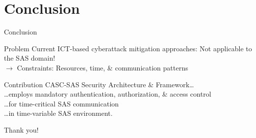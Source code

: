 \documentclass[en]{sdqbeamer}
\begin{document}
\section{Conclusion}
\begin{frame}{Conclusion}
    \begin{redblock}{Problem}
        Current ICT-based cyberattack mitigation approaches: Not applicable to the SAS domain!
        \\$\rightarrow$ Constraints: Resources, time, \& communication patterns
    \end{redblock}
    \begin{blueblock}{Contribution}
        CASC-SAS Security Architecture \& Framework\dots
        \\\dots employs mandatory authentication, authorization, \& access control
        \\\dots for time-critical SAS communication
        \\\dots in time-variable SAS environment.
    \end{blueblock}
    \vspace{0.5em}
    \centering
    \huge
    Thank you!
\end{frame}

\appendix
\beginbackup
\end{document}
